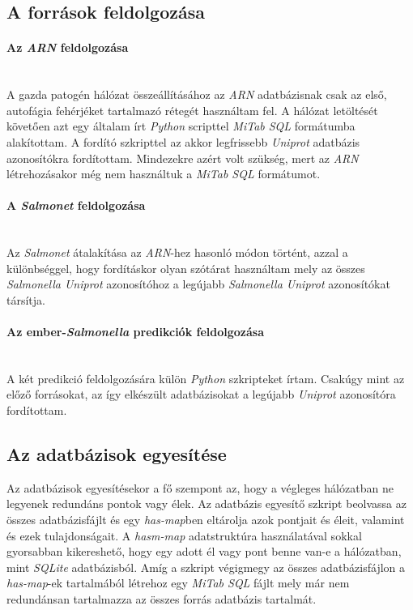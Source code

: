 \documentclass[a4paper,12pt]{article}
\begin{document}
			
	\subsection{A források feldolgozása}
			
		
	\paragraph{Az \textit{ARN} feldolgozása} \mbox{}\\
				A gazda patogén hálózat összeállításához az \textit{ARN} adatbázisnak csak az első, autofágia fehérjéket tartalmazó rétegét használtam fel. A hálózat letöltését követően azt egy általam írt \textit{Python} scripttel \textit{MiTab SQL} formátumba alakítottam. A fordító szkripttel az akkor legfrissebb \textit{Uniprot} adatbázis azonosítókra fordítottam. Mindezekre azért volt szükség, mert az \textit{ARN} létrehozásakor még nem használtuk a \textit{MiTab SQL} formátumot.	
				
	\paragraph{A \textit{Salmonet} feldolgozása} \mbox{}\\
				Az \textit{Salmonet} átalakítása az \textit{ARN}-hez hasonló módon történt, azzal a különbséggel, hogy fordításkor olyan szótárat használtam mely az összes \textit{Salmonella Uniprot} azonosítóhoz a legújabb \textit{Salmonella Uniprot} azonosítókat társítja.
				
	\paragraph{Az ember-\textit{Salmonella} predikciók feldolgozása}  \mbox{}\\
				A két predikció feldolgozására külön \textit{Python} szkripteket írtam. Csakúgy mint az előző forrásokat, az így elkészült adatbázisokat a legújabb \textit{Uniprot} azonosítóra fordítottam.
		

	\subsection{Az adatbázisok egyesítése}
		Az adatbázisok egyesítésekor a fő szempont az, hogy a végleges hálózatban ne legyenek redundáns pontok vagy élek. Az adatbázis egyesítő szkript beolvassa az összes adatbázisfájlt és egy \textit{has-map}ben eltárolja azok pontjait és éleit, valamint és ezek tulajdonságait. A \textit{hasm-map} adatstruktúra használatával sokkal gyorsabban kikereshető, hogy egy adott él vagy pont benne van-e a hálózatban, mint \textit{SQLite} adatbázisból. Amíg a szkript végigmegy az összes adatbázisfájlon a \textit{has-map}-ek tartalmából létrehoz egy \textit{MiTab SQL} fájlt mely már nem redundánsan tartalmazza az összes forrás adatbázis tartalmát.
		
\end{document}

